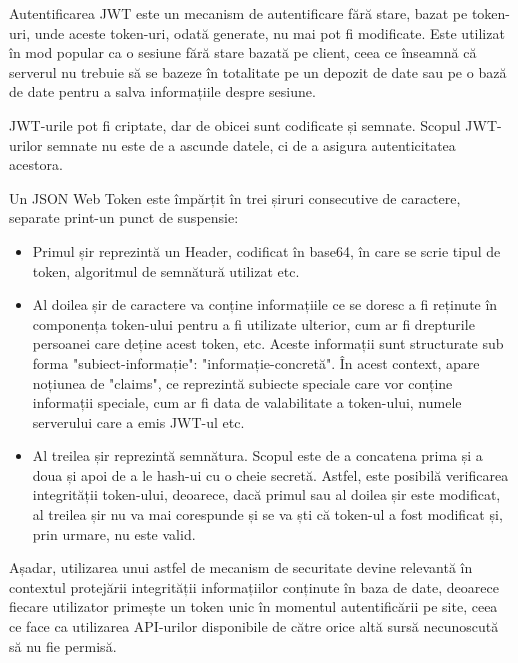 Autentificarea JWT este un mecanism de autentificare fără stare, bazat pe token-uri, unde aceste token-uri, odată generate, nu mai pot fi modificate. Este utilizat în mod popular ca o sesiune fără stare bazată pe client, ceea ce înseamnă că serverul nu trebuie să se bazeze în totalitate pe un depozit de date sau pe o bază de date pentru a salva informațiile despre sesiune.\newline

JWT-urile pot fi criptate, dar de obicei sunt codificate și semnate. Scopul JWT-urilor semnate nu este de a ascunde datele, ci de a asigura autenticitatea acestora.\newline

Un JSON Web Token este împărțit în trei șiruri consecutive de caractere, separate print-un punct de suspensie:

\begin{itemize}
	\item{Primul șir reprezintă un Header, codificat în base64, în care se scrie tipul de token, algoritmul de semnătură utilizat etc.}
	\item{Al doilea șir de caractere va conține informațiile ce se doresc a fi reținute în componența token-ului pentru a fi utilizate ulterior, cum ar fi drepturile persoanei care deține acest token, etc. Aceste informații sunt structurate sub forma "subiect-informație": "informație-concretă". În acest context, apare noțiunea de "claims", ce reprezintă subiecte speciale care vor conține informații speciale, cum ar fi data de valabilitate a token-ului, numele serverului care a emis JWT-ul etc.}
	\item{Al treilea șir reprezintă semnătura. Scopul este de a concatena prima și a doua și apoi de a le hash-ui cu o cheie secretă. Astfel, este posibilă verificarea integrității token-ului, deoarece, dacă primul sau al doilea șir este modificat, al treilea șir nu va mai corespunde și se va ști că token-ul a fost modificat și, prin urmare, nu este valid.}
	\newline
\end{itemize}

Așadar, utilizarea unui astfel de mecanism de securitate devine relevantă în contextul protejării integrității informațiilor conținute în baza de date, deoarece fiecare utilizator primește un token unic în momentul autentificării pe site, ceea ce face ca utilizarea API-urilor disponibile de către orice altă sursă necunoscută să nu fie permisă.\newline

